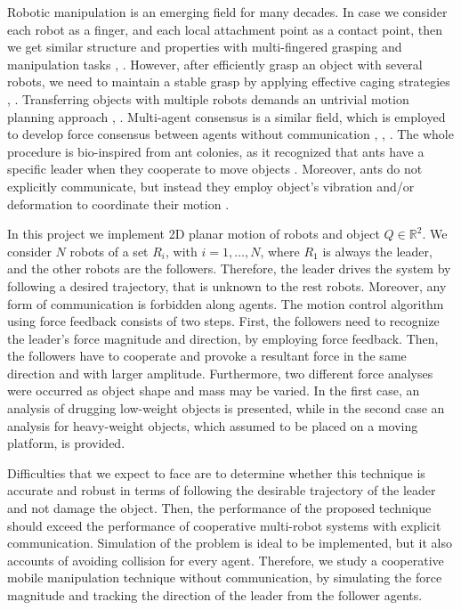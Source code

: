 \documentclass[letterpaper, 10 pt, conference]{ieeeconf}
\begin{document}
Robotic manipulation is an emerging field for many decades. In case we consider each robot as a finger, and each local attachment point as a contact point, then we get similar structure and properties with multi-fingered grasping and manipulation tasks \cite{murray1994mathematical}, \cite{prattichizzo2016grasping}. However, after efficiently grasp an object with several robots, we need to maintain a stable grasp by applying effective caging strategies \cite{fink2008multi}, \cite{pereira2004decentralized}. Transferring objects with multiple robots demands an untrivial motion planning approach \cite{donald1997information}, \cite{rus1995moving}. Multi-agent consensus is a similar field, which is employed to develop force consensus between agents without communication \cite{jadbabaie2003coordination}, \cite{olfati2007consensus}, \cite{ren2005consensus}. The whole procedure is bio-inspired from ant colonies, as it recognized that ants have a specific leader when they cooperate to move objects \cite{gelblum2015ant}. Moreover, ants do not explicitly communicate, but instead they employ object's vibration and/or deformation to coordinate their motion \cite{mccreery2014cooperative}. 

In this project we implement 2D planar motion of robots and object $Q \in \mathbb{R}^2$. We consider $N$ robots of a set $R_i$, with $i=1, \hdots ,N$, where $R_1$ is always the leader, and the other robots are the followers. Therefore, the leader drives the system by following a desired trajectory, that is unknown to the rest robots. Moreover, any form of communication is forbidden along agents. The motion control algorithm using force feedback consists of two steps. First, the followers need to recognize the leader's force magnitude and direction, by employing force feedback. Then, the followers have to cooperate and provoke a resultant force in the same direction and with larger amplitude.  Furthermore, two different force analyses were occurred as object shape and mass may be varied. In the first case, an analysis of drugging low-weight objects is presented, while in the second case an analysis for heavy-weight objects, which assumed to be placed on a moving platform, is provided. 

Difficulties that we expect to face are to determine whether this technique is accurate and robust in terms of following the desirable trajectory of the leader and not damage the object. Then, the performance of the proposed technique should exceed the performance of cooperative multi-robot systems with explicit communication. Simulation of the problem is ideal to be implemented, but it also accounts of avoiding collision for every agent. Therefore, we study a cooperative mobile manipulation technique without communication, by simulating the force magnitude and tracking the direction of the leader from the follower agents.
\end{document}
